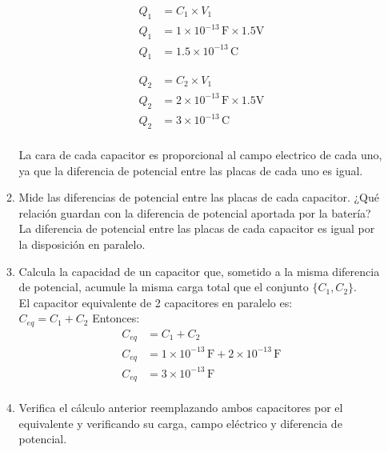 \documentclass[12pt]{report}
\begin{document}
\begin{enumerate}
\begin{enumerate}
            \begin{align*}
            Q_1&= C_1 \times V_1\\[6pt]
            Q_1&= 1 \times 10^{-13} \,\text{F} \times 1.5 \text{V}\\[6pt]
            Q_1&= 1.5\times 10^{-13} \,\text{C}
            \end{align*}


            \begin{align*}
            Q_2&= C_2 \times V_1\\[6pt]
            Q_2&= 2 \times 10^{-13} \,\text{F} \times 1.5 \text{V}\\[6pt]
            Q_2&= 3\times 10^{-13} \,\text{C}\\[12pt] 
            \end{align*}

            La cara de cada capacitor es proporcional al campo electrico de cada uno, ya que la diferencia de potencial entre las placas de cada uno es igual.\\

        \item Mide las diferencias de potencial entre las placas de cada capacitor. ¿Qué relación guardan con la diferencia de potencial aportada por la batería?\\[6pt]
            La diferencia de potencial entre las placas de cada capacitor es igual por la disposición en paralelo.\\

\newpage

        \item Calcula la capacidad de un capacitor que, sometido a la misma diferencia de potencial, acumule la misma carga total que el conjunto $\{C_1, C_2\}$.\\[6pt]
            El capacitor equivalente de 2 capacitores en paralelo es:\\
            $C_{eq}=C_1+C_2$ Entonces:\\

            \begin{align*}
                C_{eq}&=C_1+C_2\\[6pt]
                C_{eq}&= 1 \times 10^{-13} \, \text{F} +  2 \times 10^{-13} \, \text{F}\\[6pt]
                C_{eq}&= 3\times 10^{-13} \, \text{F}\\[12pt]
            \end{align*}


        \item Verifica el cálculo anterior reemplazando ambos capacitores por el equivalente y verificando su carga, campo eléctrico y diferencia de potencial.


\end{enumerate}
\end{enumerate}
\end{document}
